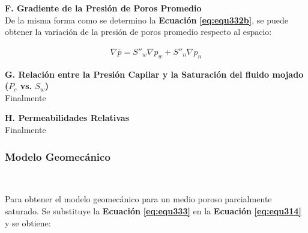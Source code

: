 \textbf{F. Gradiente de la Presión de Poros Promedio}
\\
De la misma forma como se determino la \textbf{Ecuación} \textbf{\ref{eq:equ332b}}, se puede obtener la variación de la presión de poros promedio respecto al espacio:

\begin{ceqn} 
\begin{gather} \label{eq:equ333} 
\nabla \overline{p} = S''_w\nabla p_w + S''_n\nabla p_n
\end{gather}  
\end{ceqn}


\bigskip
\textbf{G. Relación entre la Presión Capilar y la Saturación del fluido mojado ($P_c$ vs. $S_w$)}
\\
Finalmente



\bigskip
\textbf{H. Permeabilidades Relativas}
\\
Finalmente





\subsubsection{Modelo Geomecánico}~\hypertarget{sec:sec3222}{}
\label{sec:sec3221}


Para obtener el modelo geomecánico para un medio poroso parcialmente saturado. Se substituye la \textbf{Ecuación} \textbf{\ref{eq:equ333}} en la \textbf{Ecuación} \textbf{\ref{eq:equ314}} y se obtiene:\bigskip


